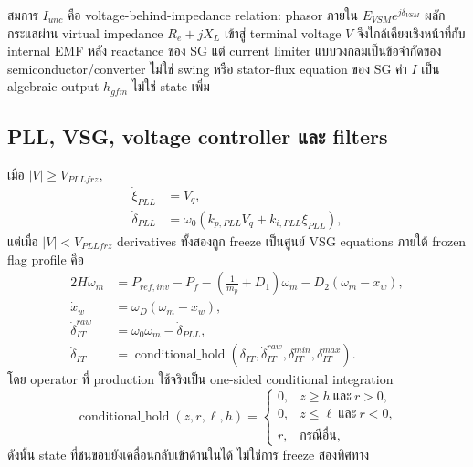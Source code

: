 \documentclass[12pt,a4paper]{article}
\newcommand{\hold}{\operatorname{conditional\_hold}}
\begin{document}
สมการ $I_{unc}$ คือ voltage-behind-impedance relation: phasor ภายใน
$E_{VSM}e^{j\delta_{VSM}}$ ผลักกระแสผ่าน virtual impedance $R_e+jX_L$
เข้าสู่ terminal voltage $V$ จึงใกล้เคียงเชิงหน้าที่กับ internal EMF หลัง reactance ของ SG
แต่ current limiter แบบวงกลมเป็นข้อจำกัดของ semiconductor/converter ไม่ใช่ swing หรือ
stator-flux equation ของ SG ค่า $I$ เป็น algebraic output $h_{gfm}$ ไม่ใช่ state เพิ่ม

\subsection{PLL, VSG, voltage controller และ filters}

เมื่อ $|V|\ge V_{PLLfrz}$,
\begin{align}
\dot\xi_{PLL}&=V_q,\\
\dot\delta_{PLL}&=\omega_0(k_{p,PLL}V_q+k_{i,PLL}\xi_{PLL}),
\end{align}
แต่เมื่อ $|V|<V_{PLLfrz}$ derivatives ทั้งสองถูก freeze เป็นศูนย์
VSG equations ภายใต้ frozen flag profile คือ
\begin{align}
2H\dot\omega_m &= P_{ref,inv}-P_f-\left(\frac{1}{m_p}+D_1\right)\omega_m
-D_2(\omega_m-x_w),\\
\dot x_w&=\omega_D(\omega_m-x_w),\\
\dot\delta_{IT}^{raw}&=\omega_0\omega_m-\dot\delta_{PLL},\\
\dot\delta_{IT}&=\hold(\delta_{IT},\dot\delta_{IT}^{raw},
\delta_{IT}^{min},\delta_{IT}^{max}).
\end{align}
โดย operator ที่ production ใช้จริงเป็น one-sided conditional integration
\begin{equation}
\hold(z,r,\ell,h)=
\begin{cases}
0,&z\ge h\ \text{และ}\ r>0,\\
0,&z\le \ell\ \text{และ}\ r<0,\\
r,&\text{กรณีอื่น},
\end{cases}
\label{eq:gfm-hold}
\end{equation}
ดังนั้น state ที่ชนขอบยังเคลื่อนกลับเข้าด้านในได้ ไม่ใช่การ freeze สองทิศทาง
\end{document}
